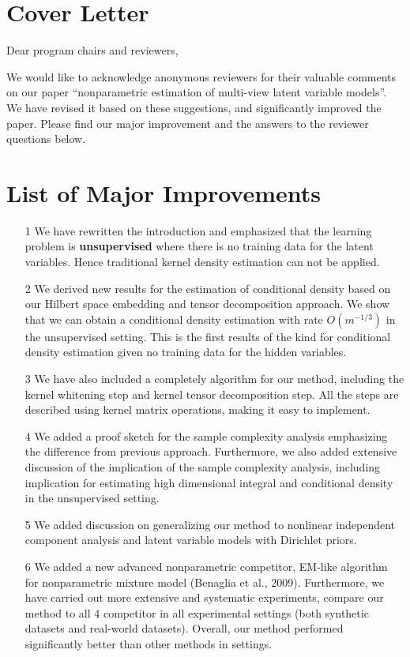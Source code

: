 \documentclass{article}
\begin{document}
\section*{Cover Letter}

Dear program chairs and reviewers,

We would like to acknowledge anonymous reviewers for their valuable comments on our paper ``nonparametric estimation of multi-view latent variable models''. We have revised it based on these suggestions, and significantly improved the paper. Please find our major improvement and the answers to the reviewer questions below.

\section*{List of Major Improvements}

\begin{itemize}
\item[1] We have rewritten the introduction and emphasized that the learning problem is {\bf unsupervised} where there is no training data for the latent variables. Hence traditional kernel density estimation can not be applied.

\item[2] We derived new results for the estimation of conditional density based on our Hilbert space embedding and tensor decomposition approach. We show that we can obtain a conditional density estimation with rate $O(m^{-1/3})$ in the unsupervised setting. This is the first results of the kind for conditional density estimation given no training data for the hidden variables.

\item[3] We have also included a completely algorithm for our method, including the kernel whitening step and kernel tensor decomposition step. All the steps are described using kernel matrix operations, making it easy to implement.

\item[4] We added a proof sketch for the sample complexity analysis emphasizing the difference from previous approach. Furthermore, we also added extensive discussion of the implication of the sample complexity analysis, including implication for estimating high dimensional integral and conditional density in the unsupervised setting.

\item[5] We added discussion on generalizing our method to nonlinear independent component analysis and latent variable models with Dirichlet priors.

\item[6] We added a new advanced nonparametric competitor, EM-like algorithm for nonparametric mixture model (Benaglia et al., 2009). Furthermore, we have carried out more extensive and systematic experiments, compare our method to all 4 competitor in all experimental settings (both synthetic datasets and real-world datasets). Overall, our method performed significantly better than other methods in settings.

\end{itemize}
\end{document}
